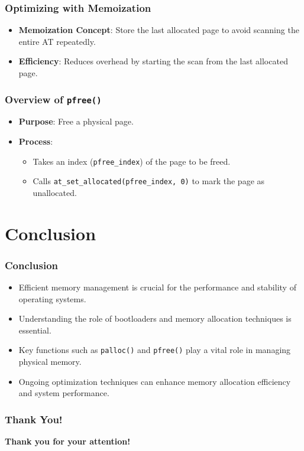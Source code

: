 \documentclass{beamer}
\begin{document}
	\begin{frame}
		\frametitle{Optimizing with Memoization}
		\begin{itemize}
			\item \textbf{Memoization Concept}: Store the last allocated page to avoid scanning the entire AT repeatedly.
			\item \textbf{Efficiency}: Reduces overhead by starting the scan from the last allocated page.
		\end{itemize}
	\end{frame}
	
	\begin{frame}
		\frametitle{Overview of \texttt{pfree()}}
		\begin{itemize}
			\item \textbf{Purpose}: Free a physical page.
			\item \textbf{Process}:
			\begin{itemize}
				\item Takes an index (\texttt{pfree\_index}) of the page to be freed.
				\item Calls \texttt{at\_set\_allocated(pfree\_index, 0)} to mark the page as unallocated.
			\end{itemize}
		\end{itemize}
	\end{frame}
	
	\section{Conclusion}
	\begin{frame}
		\frametitle{Conclusion}
		\begin{itemize}
			\item Efficient memory management is crucial for the performance and stability of operating systems.
			\item Understanding the role of bootloaders and memory allocation techniques is essential.
			\item Key functions such as \texttt{palloc()} and \texttt{pfree()} play a vital role in managing physical memory.
			\item Ongoing optimization techniques can enhance memory allocation efficiency and system performance.
		\end{itemize}
	\end{frame}
	
	\begin{frame}
		\frametitle{Thank You!}
		\begin{center}
			\textbf{Thank you for your attention!} \\
			\vspace{1em}
		\end{center}
	\end{frame}
	
	
	
	
	

	
	
	
	

	
\end{document}
